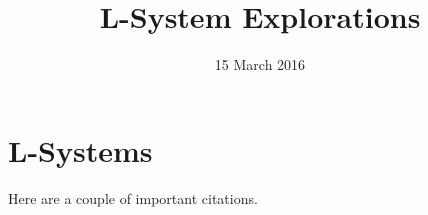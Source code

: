 \documentclass[letterpaper,11pt,reqno]{amsart}
\begin{document}
\title{L-System Explorations}
\date{15 March 2016}
\maketitle

\section{L-Systems}

Here are a couple of important citations.\cite{prusinkiewicz2012algorithmic}\cite{manousakis2006musical}



\end{document}

